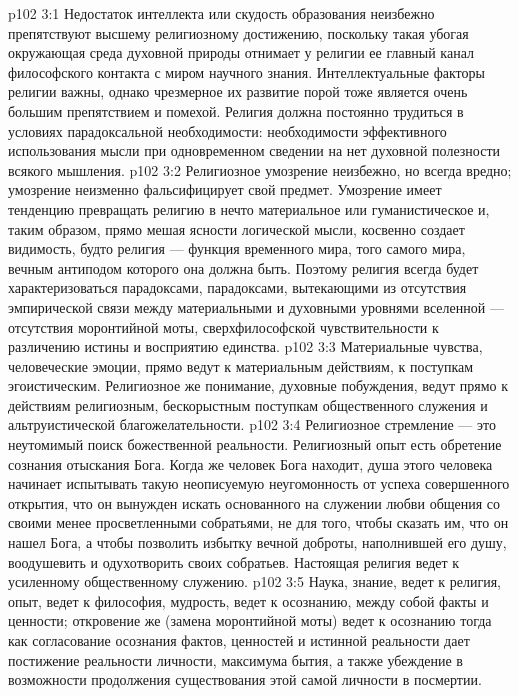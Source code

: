 \vs p102 3:1 Недостаток интеллекта или скудость образования неизбежно препятствуют высшему религиозному достижению, поскольку такая убогая окружающая среда духовной природы отнимает у религии ее главный канал философского контакта с миром научного знания. Интеллектуальные факторы религии важны, однако чрезмерное их развитие порой тоже является очень большим препятствием и помехой. Религия должна постоянно трудиться в условиях парадоксальной необходимости: необходимости эффективного использования мысли при одновременном сведении на нет духовной полезности всякого мышления.
\vs p102 3:2 Религиозное умозрение неизбежно, но всегда вредно; умозрение неизменно фальсифицирует свой предмет. Умозрение имеет тенденцию превращать религию в нечто материальное или гуманистическое и, таким образом, прямо мешая ясности логической мысли, косвенно создает видимость, будто религия --- функция временного мира, того самого мира, вечным антиподом которого она должна быть. Поэтому религия всегда будет характеризоваться парадоксами, парадоксами, вытекающими из отсутствия эмпирической связи между материальными и духовными уровнями вселенной --- отсутствия моронтийной моты, сверхфилософской чувствительности к различению истины и восприятию единства.
\vs p102 3:3 Материальные чувства, человеческие эмоции, прямо ведут к материальным действиям, к поступкам эгоистическим. Религиозное же понимание, духовные побуждения, ведут прямо к действиям религиозным, бескорыстным поступкам общественного служения и альтруистической благожелательности.
\vs p102 3:4 Религиозное стремление --- это неутомимый поиск божественной реальности. Религиозный опыт есть обретение сознания отыскания Бога. Когда же человек Бога находит, душа этого человека начинает испытывать такую неописуемую неугомонность от успеха совершенного открытия, что он вынужден искать основанного на служении любви общения со своими менее просветленными собратьями, не для того, чтобы сказать им, что он нашел Бога, а чтобы позволить избытку вечной доброты, наполнившей его душу, воодушевить и одухотворить своих собратьев. Настоящая религия ведет к усиленному общественному служению.
\vs p102 3:5 \pc Наука, знание, ведет к  религия, опыт, ведет к  философия, мудрость, ведет к осознанию,  между собой факты и ценности; откровение же (замена моронтийной моты) ведет к осознанию  тогда как согласование осознания фактов, ценностей и истинной реальности дает постижение реальности личности, максимума бытия, а также убеждение в возможности продолжения существования этой самой личности в посмертии.
